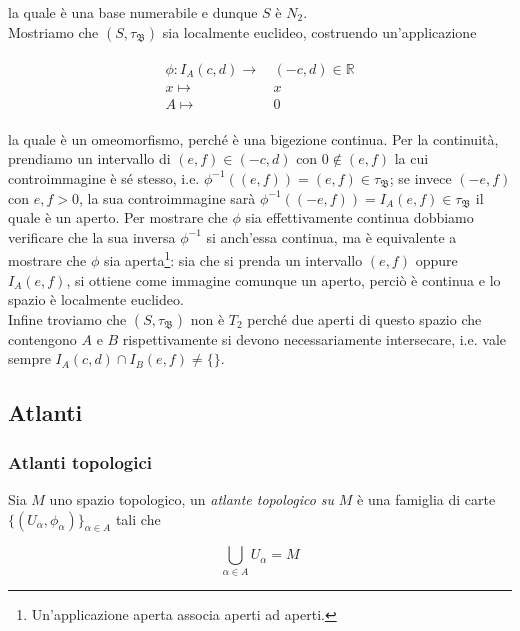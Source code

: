 la quale è una base numerabile e dunque $ S $ è $ N_{2} $.\\
Mostriamo che $ (S,\tau_{\mathfrak{B}}) $ sia localmente euclideo, costruendo un'applicazione

\begin{align}
	\begin{split}
		\phi : I_{A}(c,d) \to& \, (-c,d) \in \mathbb{R}\\
		x \mapsto& \, x\\
		A \mapsto& \, 0
	\end{split}
\end{align}

la quale è un omeomorfismo, perché è una bigezione continua. Per la continuità, prendiamo un intervallo di $ (e,f) \in (-c,d) $ con $ 0 \notin (e,f) $ la cui controimmagine è sé stesso, i.e. $ \phi^{-1}((e,f)) = (e,f) \in \tau_{\mathfrak{B}} $; se invece $ (-e,f) $ con $ e,f>0 $, la sua controimmagine sarà $ \phi^{-1}((-e,f)) = I_{A}(e,f) \in \tau_{\mathfrak{B}} $ il quale è un aperto. Per mostrare che $ \phi $ sia effettivamente continua dobbiamo verificare che la sua inversa $ \phi^{-1} $ si anch'essa continua, ma è equivalente a mostrare che $ \phi $ sia aperta\footnote{%
	Un'applicazione aperta associa aperti ad aperti.%
}: sia che si prenda un intervallo $ (e,f) $ oppure $ I_{A}(e,f) $, si ottiene come immagine comunque un aperto, perciò è continua e lo spazio è localmente euclideo.\\
Infine troviamo che $ (S,\tau_{\mathfrak{B}}) $ non è $ T_{2} $ perché due aperti di questo spazio che contengono $ A $ e $ B $ rispettivamente si devono necessariamente intersecare, i.e. vale sempre $ I_{A}(c,d) \cap I_{B}(e,f) \neq \{\} $.

\subsection{Atlanti}

\subsubsection{Atlanti topologici}

Sia $ M $ uno spazio topologico, un \textit{atlante topologico su } $ M $ è una famiglia di carte $ \{(U_{\alpha},\phi_{\alpha})\}_{\alpha \in A} $ tali che

\begin{equation}
	\bigcup_{\alpha \in A} U_{\alpha} = M
\end{equation}

